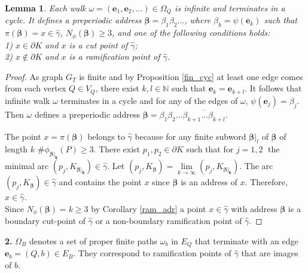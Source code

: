 \documentclass[11pt,reqno]{amsart}
\newtheorem{lemma}[theorem]{Lemma}
\newcommand{\be}{{\bm e}}
\newcommand{\hga}{{\hat\gamma}}
\newcommand{\Nfi}{{N_\phi}}
\begin{document}
\begin{lemma} \label{inf_walks}
Each walk $\omega=(\be_1,\be_2,...)\in\Omega_Q$ is infinite and terminates in a cycle.
It defines a preperiodic address ${\bm\beta}=\beta_1\beta_2...$, where $\beta_k=\psi(\be_k)$ such that $\pi({\bm\beta})=x\in\hga$, $\Nfi({\bm\beta}) \ge 3$,
and one of the following conditions  holds:\\
1) $x\in \partial K$ and $x$ is a cut point of $\hat \gamma$;\\
2) $x\notin \partial K$ and $x$ is a ramification point of $\hat \gamma$.
\end{lemma}

 \begin{proof}\label{path_bk}
 As graph $G_T$ is finite and by Proposition \ref{fin_cyc} at least one edge comes from each vertex $Q \in V_Q$, there exist $k, l \in \mathbb{N}$ such that $\bm{e}_k = \bm{e}_{k+l}$. It follows that infinite walk $\omega$ terminates in a cycle and for any of the  edges of $\omega$, $\psi({\bm e_j})= {{\beta}}_j$. Then $\omega$ defines a preperiodic address $\bm{\beta}={\beta}_{1}{\beta}_{2} \hdots \overline{{\beta}_{k+1} \hdots {\beta}_{k+l}}$. 

 The point $x = \pi({\bm\beta})$ belongs to  $\hat{\gamma}$ because for any finite subword ${\bm \beta}|_{l}$ of ${\bm{\beta}}$ of length $k$ $\#\phi_{\bm{\beta|_{k}}}(P)\geq 3$. There exist $p_1, p_2 \in \partial K$ such that for $j=1,2\;$
the minimal arc $(p_j, K_{\bm{\beta|_{k}}}) \in \hat{\gamma}$. Let $(p_j, K_{\bm {\beta}}) = \lim\limits_{k \to \infty} (p_j, K_{\bm {\beta|_{k}}})$. The arc $(p_j, K_{\bm {\beta}}) \in \hat{\gamma}$ and contains the point $x$ since ${\bm \beta}$ is an address of $x$. Therefore, $x \in \hat{\gamma}$. \\
  Since $\Nfi({ \bm \beta}) = k \geq 3$   by Corollary \ref{ram_adr}  a point $x \in \hat{\gamma}$ with address $\bm{\beta}$ is a boundary cut-point of $\hat{\gamma}$  or a non-boundary ramification point of $\hat{\gamma}$.
 \end{proof}
 

{\bf 2.} $\Omega_B$ denotes a set of proper finite paths $\omega_b$ in $E_Q$ that terminate with an edge $\be_b=(Q,b )\in E_B$. They  correspond to ramification points of $\hga$ that are images of  $b $. 
\end{document}
